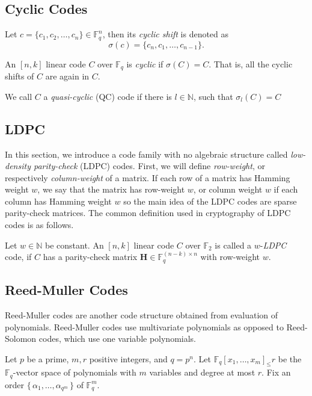 \subsection{Cyclic Codes}
Let $c=\{c_1, c_2, \dots, c_n\} \in \mathbb{F}_q^n$, then its \textit{cyclic shift} is denoted as
\[
\sigma(c) = \{c_n, c_1, \dots, c_{n-1}\}.
\]

\begin{definition}
An $[n, k]$ linear code $C$ over $\mathbb{F}_q$ is \textit{cyclic} if $\sigma(C) = C$. That is, all the cyclic shifts of $C$ are again in $C$.    
\end{definition}
We call $C$ a \textit{quasi-cyclic} (QC) code if there is $l \in \mathbb{N}$, such that $\sigma_l(C) = C$

\subsection{LDPC}
In this section, we introduce a code family with no algebraic structure called \textit{low-density parity-check} (LDPC) codes. First, we will define \textit{row-weight}, or respectively \textit{column-weight} of a matrix. If each row of a matrix has Hamming weight $w$, we say that the matrix has row-weight $w$, or column weight $w$ if each column has Hamming weight $w$ so the main idea of the LDPC codes are sparse parity-check matrices. The common definition used in cryptography of LDPC codes is as follows.

\begin{definition}
Let $w \in \mathbb{N}$ be constant. An $[n, k]$ linear code $C$ over $\mathbb{F}_2$ is called a $w$-\textit{LDPC} code, if $C$ has a parity-check matrix $\mathbf{H} \in\mathbb{F}_q^{(n-k)\times n}$ with row-weight $w$.
\end{definition}



\subsection{Reed-Muller Codes}

Reed-Muller codes are another code structure obtained from evaluation of polynomials. Reed-Muller codes use multivariate polynomials as opposed to Reed-Solomon codes, which use one variable polynomials.

Let $p$ be a prime, $m,r$ positive integers, and $q = p^n$. Let $\mathbb{F}_q[x_1, \dots, x_m]_\leq r$ be the $\mathbb{F}_q$-vector space of polynomials with $m$ variables and degree at most $r$. Fix an order $\{\, \alpha_1, \dots, \alpha_{q^m} \,\}$ of $\mathbb{F}_q^m$.

